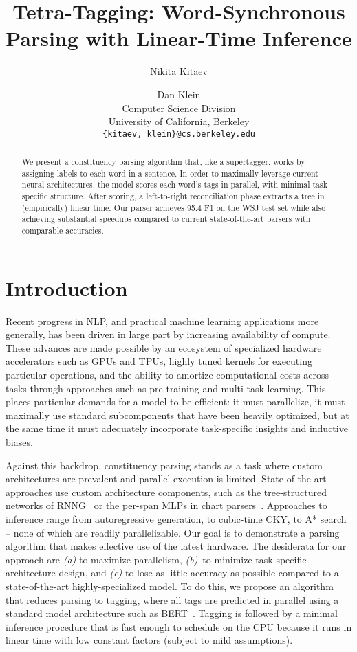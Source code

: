 \documentclass[11pt,a4paper]{article}
\title{Tetra-Tagging: Word-Synchronous Parsing with Linear-Time Inference}
\author{Nikita Kitaev \and Dan Klein \\
  Computer Science Division \\
  University of California, Berkeley \\
  {\tt \{kitaev, klein\}@cs.berkeley.edu}}
\date{}
\begin{document}
\maketitle
\begin{abstract}
We  present  a  constituency  parsing  algorithm that, like a supertagger, works by assigning labels  to  each  word  in  a  sentence.   In order to maximally leverage current neural architectures, the model scores each word's tags in parallel, with minimal task-specific structure.  After scoring, a left-to-right reconciliation phase extracts a tree in (empirically) linear time.  Our parser achieves 95.4 F1 on the WSJ test set while also achieving substantial speedups compared to current state-of-the-art parsers with comparable accuracies.

\end{abstract}

\section{Introduction}

Recent progress in NLP, and practical machine learning applications more generally, has been driven in large part by increasing availability of compute. These advances are made possible by an ecosystem of specialized hardware accelerators such as GPUs and TPUs, highly tuned kernels for executing particular operations, and the ability to amortize computational costs across tasks through approaches such as pre-training and multi-task learning. This places particular demands for a model to be efficient: it must parallelize, it must maximally use standard subcomponents that have been heavily optimized, but at the same time it must adequately incorporate task-specific insights and inductive biases.

Against this backdrop, constituency parsing stands as a task where custom architectures are prevalent and parallel execution is limited. State-of-the-art approaches use custom architecture components, such as the tree-structured networks of RNNG~\citep{dyer-etal-2016-recurrent} or the per-span MLPs in chart parsers~\citep{stern-etal-2017-minimal,kitaev-etal-2019-multilingual}. Approaches to inference range from autoregressive generation, to cubic-time CKY, to A* search -- none of which are readily parallelizable. Our goal is to demonstrate a parsing algorithm that makes effective use of the latest hardware. The desiderata for our approach are \emph{(a)} to maximize parallelism, \emph{(b)}~to minimize task-specific architecture design, and \emph{(c)} to lose as little accuracy as possible compared to a state-of-the-art highly-specialized model. To do this, we propose an algorithm that reduces parsing to tagging, where all tags are predicted in parallel using a standard model architecture such as BERT~\citep{devlin-etal-2019-bert}. Tagging is followed by a minimal inference procedure that is fast enough to schedule on the CPU because it runs in linear time with low constant factors (subject to mild assumptions).
\end{document}
